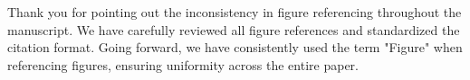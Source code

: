 \documentclass[a4paper,twoside,11pt,dvipsnames]{reviewresponse}
\begin{document}

Thank you for pointing out the inconsistency in figure referencing throughout the manuscript. We have carefully reviewed all figure references and standardized the citation format. Going forward, we have consistently used the term "Figure" when referencing figures, ensuring uniformity across the entire paper.

\end{document}
